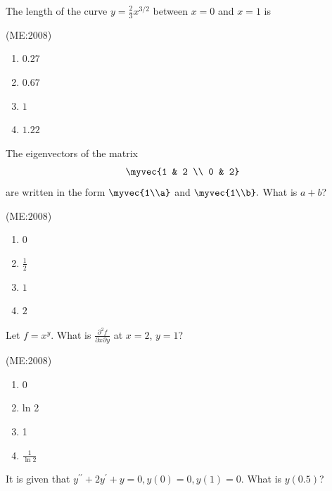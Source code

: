     \item
        The length of the curve $y = \frac{2}{3}x^{3/2}$ between $x=0$ and $x=1$ is

        \hfill{(ME:2008)}
        \begin{multicols}{4}
            \begin{enumerate}
                \item $0.27$
                \item $0.67$
                \item $1$
                \item $1.22$
            \end{enumerate}
        \end{multicols}
    
    \item
	The eigenvectors of the matrix \[\myvec
{1 & 2 \\ 0 & 2} \] are written in the form $\myvec{1\\a}$ and $\myvec{1\\b}.$ What is $a + b$?

        \hfill{(ME:2008)}
        \begin{multicols}{4}
            \begin{enumerate}
                \item $0$
                \item $\frac{1}{2}$
                \item $1$
                \item $2$
            \end{enumerate}
        \end{multicols}
                                  
    \item 
	Let $f = x^y$. What is $\frac{\partial^2 f}{\partial x \partial y}$ at $x = 2$, $y = 1$?

	 \hfill{(ME:2008)}

    \begin{multicols}{4}
        \begin{enumerate}
            \item 0
            \item ln 2
            \item 1
            \item $\frac{1}{\ln 2}$
        \end{enumerate}
    \end{multicols}

    \item 
	    It is given that $y^{\prime \prime} + 2y^\prime + y = 0, y(0) = 0, y(1) = 0$. What is $y(0.5)$?

